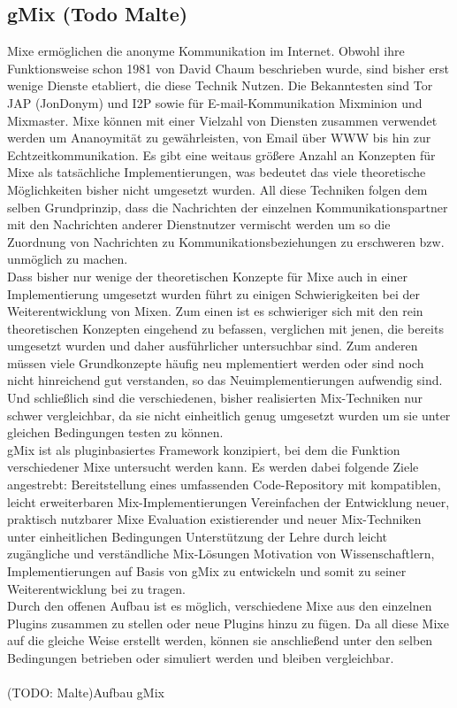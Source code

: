 \documentclass[a4paper, 11pt]{article} %
\begin{document}
\subsection{gMix (Todo Malte)} %
\label{sub:gmix}
Mixe ermöglichen die anonyme Kommunikation im Internet. Obwohl ihre Funktionsweise schon 1981 von David Chaum \cite{Cha81} beschrieben wurde, sind bisher erst wenige Dienste etabliert, die diese Technik Nutzen. Die Bekanntesten sind Tor \cite{DMS04} JAP (JonDonym) \cite{BFK01} und I2P sowie für E-mail-Kommunikation Mixminion und Mixmaster. Mixe können mit einer Vielzahl von Diensten zusammen verwendet werden um Ananoymität zu gewährleisten, von Email über WWW bis hin zur Echtzeitkommunikation. Es gibt eine weitaus größere Anzahl an Konzepten für Mixe als tatsächliche Implementierungen, was bedeutet das viele theoretische Möglichkeiten bisher nicht umgesetzt wurden. All diese Techniken folgen dem selben Grundprinzip, dass die Nachrichten der einzelnen Kommunikationspartner mit den Nachrichten anderer Dienstnutzer vermischt werden um so die Zuordnung von Nachrichten zu Kommunikationsbeziehungen zu erschweren bzw. unmöglich zu machen.
\\
Dass bisher nur wenige der theoretischen Konzepte für Mixe auch in einer Implementierung umgesetzt wurden führt zu einigen Schwierigkeiten bei der Weiterentwicklung von Mixen. Zum einen ist es schwieriger sich mit den rein theoretischen Konzepten eingehend zu befassen, verglichen mit jenen, die bereits umgesetzt wurden und daher ausführlicher untersuchbar sind. Zum anderen müssen viele Grundkonzepte häufig neu mplementiert werden oder sind noch nicht hinreichend gut verstanden, so das Neuimplementierungen aufwendig sind. Und schließlich sind die verschiedenen, bisher realisierten Mix-Techniken nur schwer vergleichbar, da sie nicht einheitlich genug umgesetzt wurden um sie unter gleichen Bedingungen testen zu können.
\\
gMix ist als pluginbasiertes Framework konzipiert, bei dem die Funktion verschiedener Mixe untersucht werden kann. Es werden dabei folgende Ziele angestrebt:
Bereitstellung eines umfassenden  Code-Repository mit kompatiblen, leicht erweiterbaren Mix-Implementierungen
Vereinfachen der Entwicklung neuer, praktisch nutzbarer Mixe
Evaluation existierender und neuer Mix-Techniken unter einheitlichen Bedingungen
Unterstützung der Lehre durch leicht zugängliche und verständliche Mix-Lösungen
Motivation von Wissenschaftlern, Implementierungen auf Basis von gMix zu entwickeln und somit zu seiner Weiterentwicklung bei zu tragen.
\\
Durch den offenen Aufbau ist es möglich, verschiedene Mixe aus den einzelnen Plugins zusammen zu stellen oder neue Plugins hinzu zu fügen. Da all diese Mixe auf die gleiche Weise erstellt werden, können sie anschließend unter den selben Bedingungen betrieben oder simuliert werden und bleiben vergleichbar.
\\
\\
(TODO: Malte)Aufbau gMix
\end{document}

